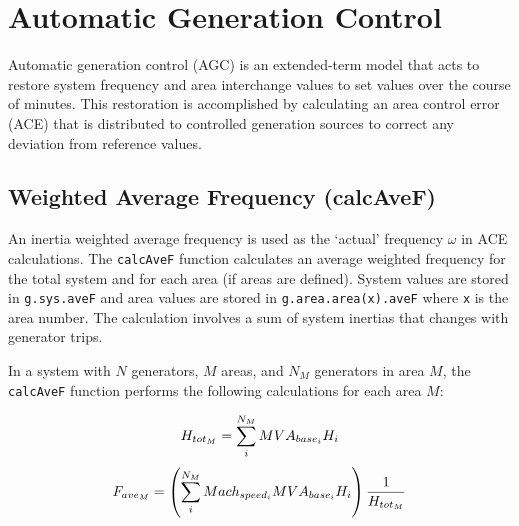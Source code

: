 \pagebreak
\section{Automatic Generation Control}  
Automatic generation control (AGC) is an extended-term model that acts to restore system frequency and area interchange values to set values over the course of minutes.
This restoration is accomplished by calculating an area control error (ACE) that is distributed to controlled generation sources to correct any deviation from reference values.




\pagebreak
\subsection{Weighted Average Frequency (calcAveF)} 
An inertia weighted average frequency is used as the `actual' frequency $\omega$ in ACE calculations.
The \verb|calcAveF| function calculates an average weighted frequency for the total system and for each area (if areas are defined).
System values are stored in \verb|g.sys.aveF| and area values are stored in \verb|g.area.area(x).aveF| where \verb|x| is the area number.
The calculation involves a sum of system inertias that changes with generator trips.


\vspace{1em}
In a system with $N$ generators, $M$ areas, and $N_M$ generators in area $M$, the \verb|calcAveF| function performs the following calculations for each area $M$:

\begin{equation}{\label{eq: areaH} }
H_{tot_M} = \sum_{i}^{N_M} MVA_{base_i}H_i
\end{equation} 
\vspace{-1em}
\begin{equation}{\label{eq: areaF} }
F_{ave_M} = \left( \sum_{i}^{N_M}Mach_{speed_i}MVA_{base_i}H_i \right) \dfrac{1}{H_{tot_M}}
\end{equation}
\vspace{0.5 em}

